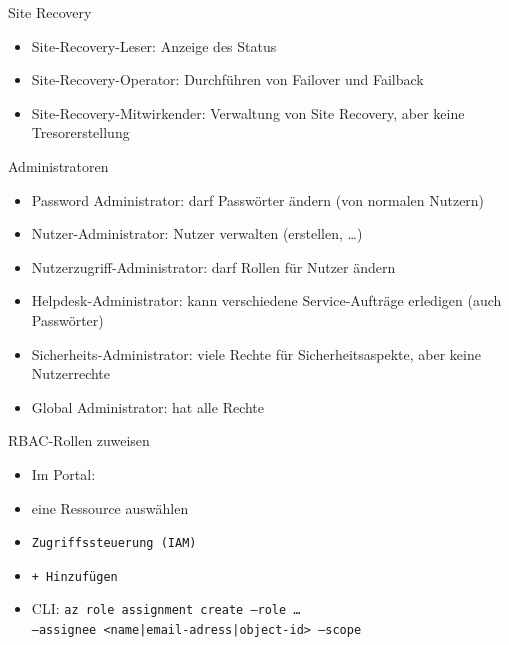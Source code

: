 \begin{flashcard}[Definition]{Site Recovery}
    \begin{itemize}
        \item Site-Recovery-Leser: Anzeige des Status
        \item Site-Recovery-Operator: Durchführen von Failover und Failback
        \item Site-Recovery-Mitwirkender: Verwaltung von Site Recovery, aber keine Tresorerstellung
    \end{itemize}
\end{flashcard}


\begin{flashcard}[Definition]{Administratoren}
    \begin{itemize}
        \item Password Administrator: darf Passwörter ändern (von normalen Nutzern)
        \item Nutzer-Administrator: Nutzer verwalten (erstellen, \ldots)
        \item Nutzerzugriff-Administrator: darf Rollen für Nutzer ändern
        \item Helpdesk-Administrator: kann verschiedene Service-Aufträge erledigen (auch Passwörter)
        \item Sicherheits-Administrator: viele Rechte für Sicherheitsaspekte, aber keine Nutzerrechte
        \item Global Administrator: hat alle Rechte
    \end{itemize}
\end{flashcard}





\begin{flashcard}[Definition]{RBAC-Rollen zuweisen}
    \begin{itemize}
        \item Im Portal:\newline
            \item eine Ressource auswählen
            \item \texttt{Zugriffssteuerung (IAM)}
            \item \texttt{+ Hinzufügen}
        \item CLI:\newline
            \texttt{az role assignment create --role \ldots\\--assignee <name|email-adress|object-id> --scope}
    \end{itemize}
\end{flashcard}

